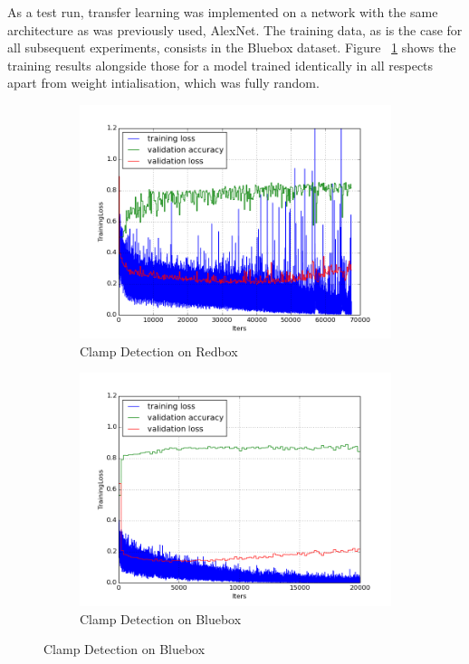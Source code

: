 \documentclass[a4paper,11pt]{article}
\begin{document}
As a test run, transfer learning was implemented on a network with the same architecture as was previously used, AlexNet. The training data, as is the case for all subsequent experiments, consists in the Bluebox dataset. Figure ~\ref{f36} shows the training results alongside those for a model trained identically in all respects apart from weight intialisation, which was fully random. 

\begin{figure}[h!]
	\centering
	\begin{subfigure}{.5\textwidth}
  		\centering
		\includegraphics[scale=0.4]{images/plot_clampdet_tl_wout.png}
		\caption{Clamp Detection on Redbox}
	\end{subfigure}%
	\begin{subfigure}{.5\textwidth}
  		\centering
		\includegraphics[scale=0.4]{images/plot_clampdet_none.png}
		\caption{Clamp Detection on Bluebox}
	\end{subfigure}
    \label{f36}
\end{figure}
\end{document}
